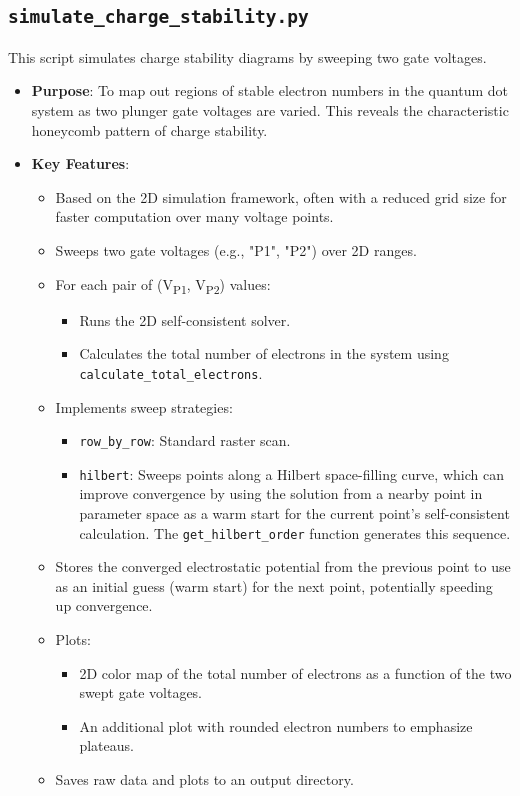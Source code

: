 \documentclass{article}
\begin{document}
\subsection{\texttt{simulate\_charge\_stability.py}}
This script simulates charge stability diagrams by sweeping two gate voltages.
\begin{itemize}
    \item \textbf{Purpose}: To map out regions of stable electron numbers in the quantum dot system as two plunger gate voltages are varied. This reveals the characteristic honeycomb pattern of charge stability.
    \item \textbf{Key Features}:
        \begin{itemize}
            \item Based on the 2D simulation framework, often with a reduced grid size for faster computation over many voltage points.
            \item Sweeps two gate voltages (e.g., "P1", "P2") over 2D ranges.
            \item For each pair of (V\textsubscript{P1}, V\textsubscript{P2}) values:
                \begin{itemize}
                    \item Runs the 2D self-consistent solver.
                    \item Calculates the total number of electrons in the system using \texttt{calculate\_total\_electrons}.
                \end{itemize}
            \item Implements sweep strategies:
                \begin{itemize}
                    \item \texttt{row\_by\_row}: Standard raster scan.
                    \item \texttt{hilbert}: Sweeps points along a Hilbert space-filling curve, which can improve convergence by using the solution from a nearby point in parameter space as a warm start for the current point's self-consistent calculation. The \texttt{get\_hilbert\_order} function generates this sequence.
                \end{itemize}
            \item Stores the converged electrostatic potential from the previous point to use as an initial guess (warm start) for the next point, potentially speeding up convergence.
            \item Plots:
                \begin{itemize}
                    \item 2D color map of the total number of electrons as a function of the two swept gate voltages.
                    \item An additional plot with rounded electron numbers to emphasize plateaus.
                \end{itemize}
            \item Saves raw data and plots to an output directory.
        \end{itemize}
\end{itemize}
\end{document}
